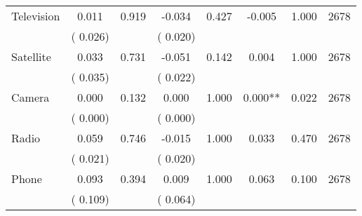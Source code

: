 \begin{tabular}{l*{7}{c}}
 Television       &              0.011       &        0.919  &             -0.034       &        0.427  &             -0.005       &              1.000 &  2678 \\ 
                       &       (       0.026)             &                               &       (       0.020)                     &                               &                                               &                                &                      \\ 

 Satellite       &              0.033       &        0.731  &             -0.051       &        0.142  &              0.004       &              1.000 &  2678 \\ 
                       &       (       0.035)             &                               &       (       0.022)                     &                               &                                               &                                &                      \\ 

 Camera       &              0.000       &        0.132  &              0.000       &        1.000  &              0.000**       &              0.022 &  2678 \\ 
                       &       (       0.000)             &                               &       (       0.000)                     &                               &                                               &                                &                      \\ 

 Radio       &              0.059       &        0.746  &             -0.015       &        1.000  &              0.033       &              0.470 &  2678 \\ 
                       &       (       0.021)             &                               &       (       0.020)                     &                               &                                               &                                &                      \\ 

 Phone       &              0.093       &        0.394  &              0.009       &        1.000  &              0.063       &              0.100 &  2678 \\ 
                       &       (       0.109)             &                               &       (       0.064)                     &                               &                                               &                                &                      \\ 


\end{tabular}
